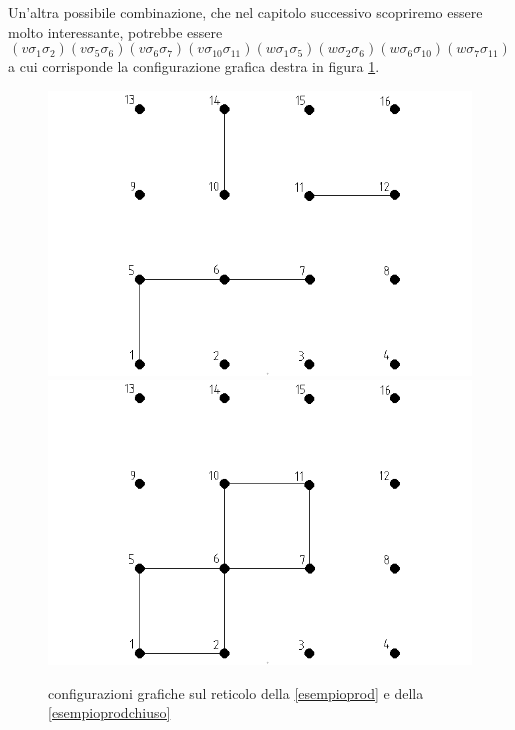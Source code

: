 \documentclass[11pt]{article}
\begin{document}
Un'altra possibile combinazione, che nel capitolo successivo scopriremo essere molto interessante, potrebbe essere
\begin{equation}\label{esempioprodchiuso}
(v\sigma_{1}\sigma_{2})(v\sigma_{5}\sigma_{6})(v\sigma_{6}\sigma_{7})(v\sigma_{10}\sigma_{11})(w\sigma_{1}\sigma_{5})(w\sigma_{2}\sigma_{6})(w\sigma_{6}\sigma_{10})(w\sigma_{7}\sigma_{11})
\end{equation}
a cui corrisponde la configurazione grafica destra in figura \ref{confgraf}.
\begin{figure}
\centering
\includegraphics[width=0.47\columnwidth]{sat21}\quad\includegraphics[width=0.47\columnwidth]{sat22}
\caption{configurazioni grafiche sul reticolo della \ref{esempioprod} e della \ref{esempioprodchiuso} }
\label{confgraf}
\end{figure}
\end{document}
